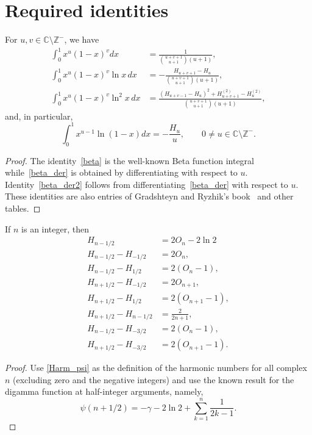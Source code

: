 \documentclass[12pt,reqno]{article}
\begin{document}
	\section{Required identities}
	
	
	\begin{lemma}\label{lem.integ}
	For $u,v\in\mathbb C\setminus\mathbb Z^{-}$, we have
	\begin{align}
	\int_0^1 x^u \left( {1 - x} \right)^v dx &= \frac{1}{{\binom{{u + v + 1}}{{u + 1}}\left( {u + 1} \right)}},\label{beta}\\
	\int_0^1 x^u \left( {1 - x} \right)^v \ln x\,dx &= -\frac{{H_{u + v + 1} - H_u}}{{\binom{{u + v + 1}}{{u + 1}} (u + 1)}}\label{beta_der},\\
	\int_0^1 x^u \left( {1 - x} \right)^v \ln ^2 x\,dx &= \frac{{\left( {H_{u + v - 1} - H_u } \right)^2 + H_{u + v + 1}^{(2)} - H_u^{(2)} }}{{		\binom{{u + v + 1}}{{u + 1}}(u + 1)}}\label{beta_der2},
	\end{align}
	and, in particular,
	\begin{equation}\label{eq.fcdh8uy}
	\int_0^1 x^{u - 1} \ln (1 - x) dx = - \frac{{H_u}}{u}, \qquad 0\ne u\in\mathbb C\setminus\mathbb Z^{-}.
	\end{equation}
	\end{lemma}
	\begin{proof}
	The identity~\eqref{beta} is the well-known Beta function integral while~\eqref{beta_der} is obtained by differentiating with respect 
	to $u$. Identity~\eqref{beta_der2} follows from differentiating~\eqref{beta_der} with respect to $u$. These identities are also entries of 	 Gradshteyn and Ryzhik's book~\cite{GrRy07} and other tables.
	\end{proof}
	
	\begin{lemma}\label{lem.ho}
	If $n$ is an integer, then
	\begin{align}
			H_{n - 1/2} &= 2O_n - 2\ln 2 \label{eq.zts4fm1} \\
			H_{n - 1/2} - H_{ - 1/2} &= 2O_n, \label{eq.plh634k} \\
			H_{n - 1/2} - H_{1/2} &= 2\left( {O_n  - 1} \right), \label{eq.hgplrbd}\\
			H_{n + 1/2} - H_{ - 1/2} &= 2O_{n + 1}, \label{eq.ivi1ex5} \\
			H_{n + 1/2} - H_{1/2} &= 2\left( {O_{n + 1}  - 1} \right), \label{eq.u6ng5d6}\\
			H_{n + 1/2} - H_{n - 1/2} &= \frac{2}{{2n + 1}},\\
			H_{n - 1/2} - H_{-3/2} &= 2\left( {O_n  - 1} \right) \label{eq.pobmr6h},\\
			H_{n + 1/2} - H_{-3/2} &= 2\left( {O_{n + 1} - 1} \right).
	\end{align}
	\end{lemma}
	\begin{proof}
	Use \eqref{Harm_psi} as the definition of the harmonic numbers for all complex $n$ (excluding zero and the negative integers) 
	and use the known result for the digamma function at half-integer arguments, namely,
	$$\psi(n+1/2) = -\gamma - 2\ln 2 + \sum_{k = 1}^n \frac{1}{2k-1}.$$
	\end{proof}
	
\end{document}
